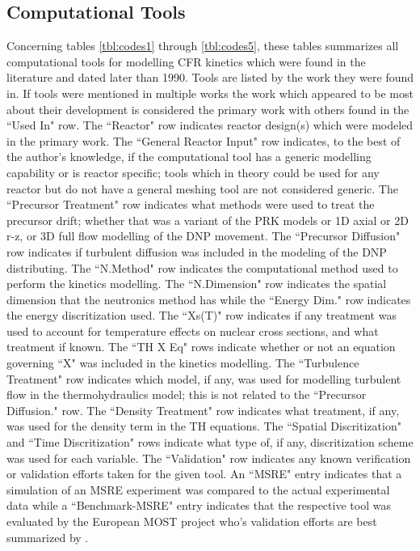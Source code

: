 \documentclass[review]{elsarticle}
\begin{document}


\begin{appendices}

\section{Computational Tools} \label{app:tools}
Concerning tables \ref{tbl:codes1} through \ref{tbl:codes5}, these tables
 summarizes all computational
tools for modelling CFR kinetics which were
found in the literature and dated later than 1990. Tools are listed by the
work they were found in. If tools were mentioned in multiple works the
work which appeared to be most about their development is considered
the primary work with others found in the ``Used In" row. The
``Reactor" row indicates reactor design(s) which were modeled in
the primary work. The ``General Reactor Input" row indicates, to the best
of the author's knowledge, if the computational tool has a generic modelling
capability or is reactor specific; tools which in theory could be used for
any reactor but do not have a general meshing tool are not considered generic.
The ``Precursor Treatment" row indicates what methods were used to
treat the precursor drift; whether that was a variant of the PRK models
or 1D axial or 2D r-z, or 3D full flow modelling of the DNP movement.
The ``Precursor Diffusion" row indicates if turbulent diffusion was included in
the modeling of the DNP distributing.
The ``N.Method" row indicates the computational method used to perform the
kinetics modelling. The ``N.Dimension" row indicates the spatial dimension that
the neutronics method has while the ``Energy Dim." row indicates the energy
discritization used.
The ``Xs(T)" row indicates if any treatment was used to account for temperature
effects on nuclear cross sections, and what treatment if known. 
The ``TH X Eq" rows indicate whether or not an equation governing ``X" was
included in the kinetics modelling.
The ``Turbulence Treatment" row 
indicates which model, if any, was used for modelling turbulent flow in the
thermohydraulics model; this is not related to the ``Precursor Diffusion." row.
The ``Density Treatment" row indicates what treatment, if any, was used for the
density term in the TH equations. The ``Spatial Discritization" and ``Time
Discritization" rows indicate what type of, if any, discritization scheme was
used for each variable. The ``Validation" row indicates any known verification
or validation efforts taken for the given tool. An ``MSRE" entry indicates
that a simulation of an MSRE experiment was compared to the actual experimental
data while a ``Benchmark-MSRE" entry indicates that the respective tool was
evaluated by the European MOST project who's validation efforts are best
summarized by \cite{delpech_benchmark_2003}.


\end{appendices}
\end{document}
